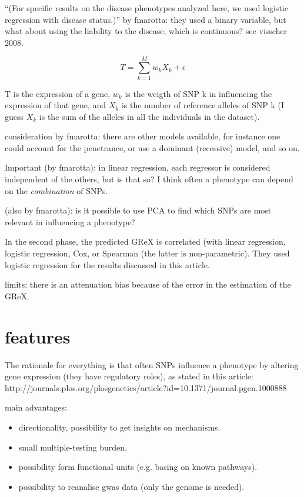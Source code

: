 \documentclass[../main.tex]{subfiles}
\begin{document}
\enquote{(For specific results on the disease phenotypes analyzed here, 
we used logistic regression with disease status.)} by fmarotta: they 
used a binary variable, but what about using the liability to the 
disease, which is continuous? see visscher 2008.

\begin{equation}
	T = \sum_{k=1}^{M}{w_k X_k + \epsilon}
\end{equation}

T is the expression of a gene, $w_k$ is the weigth of SNP k in influencing the
expression of that gene, and $X_k$ is the number of reference alleles of SNP k
(I guess $X_k$ is the sum of the alleles in all the individuals in the
dataset).

consideration by fmarotta: there are other models available, for instance one
could account for the penetrance, or use a dominant (recessive) model, and so
on.

Important (by fmarotta): in linear regression, each regressor is considered
independent of the others, but is that so? I think often a phenotype can depend
on the \textit{combination} of SNPs.

(also by fmarotta): is it possible to use PCA to find which SNPs are most
relevant in influencing a phenotype?

In the second phase, the predicted GReX is correlated (with linear regression,
logistic regression, Cox, or Spearman (the latter is non-parametric). They used
logistic regression for the results discussed in this article.

limits: there is an attenuation bias because of the error in the estimation of
the GReX.

\section{features}

The rationale for everything is that often SNPs influence a phenotype by
altering gene expression (\ie they have regulatory roles), as stated in 
this
article:
http://journals.plos.org/plosgenetics/article?id=10.1371/journal.pgen.1000888

main advantages:

\begin{itemize}
\item directionality, possibility to get insights on mechanisms.
\item small multiple-testing burden.
\item possibility form functional units (e.g. basing on known pathways).
\item possibility to reanalise gwas data (only the genome is needed).
\end{itemize}
\end{document}
